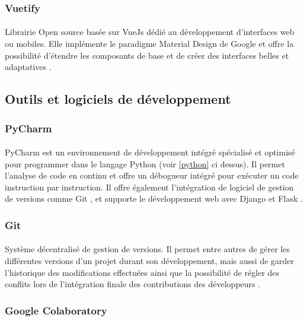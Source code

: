 		\subsubsection*{Vuetify}
		\paragraph{}
		Librairie Open source basée sur VueJs dédié au développement d'interfaces web ou mobiles. Elle implémente le paradigme Material Design de Google et offre la possibilité d'étendre les composants de base et de créer des interfaces belles et adaptatives \cite{vuetify}.
	\subsection{Outils et logiciels de développement}
		\subsubsection*{PyCharm}
		\paragraph{}
		PyCharm est un environnement de développement intégré spécialisé et optimisé pour programmer dans le langage Python (voir \ref{python} ci dessus). Il permet l'analyse de code en continu et offre un débogueur intégré pour exécuter un code instruction par instruction. Il offre également l'intégration de logiciel de gestion de versions comme Git \cite{git}, et supporte le développement web avec Django et Flask \cite{pycharm}.
		
		\subsubsection*{Git}
		\paragraph{}
		Système décentralisé de gestion de versions. Il permet entre autres de gérer les différentes versions d'un projet durant son développement, mais aussi de garder l'historique des modifications effectuées ainsi que la possibilité de régler des conflits lors de l'intégration finale des contributions des développeurs \cite{Git}.
		
		\subsubsection*{Google Colaboratory}
